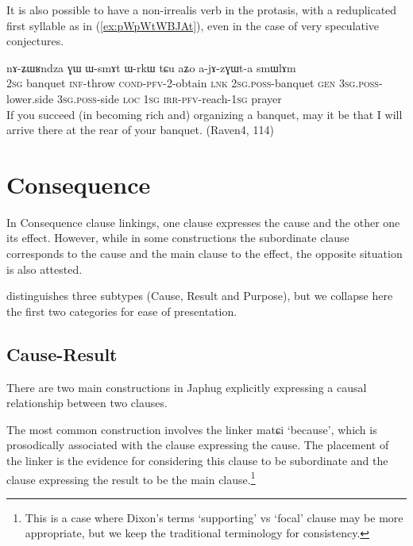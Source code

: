 \documentclass[oldfontcommands,oneside,a4paper,11pt]{article}
\newcommand{\ipa}[1]{{\phon \mbox{#1}}} %
\newcommand{\refb}[1]{(\ref{#1})}
\begin{document}
 
 It is also possible to have a non-irrealis verb in the protasis, with a reduplicated first syllable as in \refb{ex:pWpWtWBJAt}, even in the case of very speculative conjectures.
\begin{exe}
\ex \label{ex:pWpWtWBJAt}
\gll 
[\ipa{nɤʑo}  	\ipa{ʑɯʁndza}  	\ipa{kɤ-lɤt}  	\textbf{\ipa{pɯ-pɯ-tɯ-βɟɤt}}]  	\ipa{nɤ,}  	\ipa{nɤ-ʑɯʁndza}  	\ipa{ɣɯ}  	\ipa{ɯ-smɤt}  	\ipa{ɯ-rkɯ}  	\ipa{tɕu}  	\ipa{aʑo}  	\ipa{a-jɤ-zɣɯt-a}  	\ipa{smɯlɤm}  \\
\textsc{2sg} banquet \textsc{inf}-throw \textsc{cond-pfv}-2-obtain \textsc{lnk} \textsc{2sg.poss}-banquet \textsc{gen} \textsc{3sg.poss}-lower.side \textsc{3sg.poss}-side \textsc{loc} \textsc{1sg} \textsc{irr-pfv}-reach-\textsc{1sg} prayer \\
\glt  If you succeed (in becoming rich and) organizing a banquet, may it be that I will arrive there at the rear of your banquet. (Raven4, 114)
\end{exe} 


\section{Consequence}
In Consequence clause linkings, one clause expresses the cause and the other one its effect. However, while in some constructions the subordinate clause corresponds to the cause and the main clause to the effect, the opposite situation is also attested.  

\citet[17, 44]{dixon09intro} distinguishes three subtypes (Cause, Result and Purpose), but we collapse here the first two categories for ease  of presentation.



\subsection{Cause-Result} \label{sec:cause}
There are two main constructions in Japhug explicitly expressing a causal relationship between two clauses. 

The most common construction involves the linker \ipa{matɕi} `because', which is prosodically associated with the  clause expressing the cause.  The placement of the linker is the evidence for considering this clause to be subordinate and the clause expressing the result to be the main clause.\footnote{This is a case where Dixon's terms `supporting' vs `focal' clause may be more appropriate, but we keep the traditional terminology for consistency.}
\end{document}
